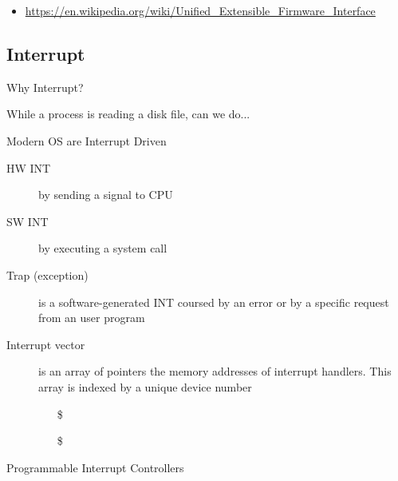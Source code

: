 \begin{itemize}
\item \url{https://en.wikipedia.org/wiki/Unified_Extensible_Firmware_Interface}
\end{itemize}

\subsection{Interrupt}
\label{sec:interrupt}

\begin{frame}{Why Interrupt?}
  \begin{iblock}{While a process is reading a disk file, can we do...}
    \begin{center}
    \end{center}
  \end{iblock}
\end{frame}

\begin{frame}{Modern OS are Interrupt Driven}
  \begin{description}
  \item[HW INT] by sending a signal to CPU
  \item[SW INT] by executing a \alert{system call}
  \item[Trap (exception)] is a software-generated INT coursed by an error or by a
    specific request from an user program
  \item[Interrupt vector] is an array of pointers {\pright} the memory addresses
    of \alert{interrupt handlers}. This array is indexed by a unique device number
    \begin{itemize}
    \item[\$] 
    \item[\$] 
    \end{itemize}
  \end{description}
\end{frame}

\begin{frame}{Programmable Interrupt Controllers}
  \begin{center}
  \end{center}
\end{frame}

